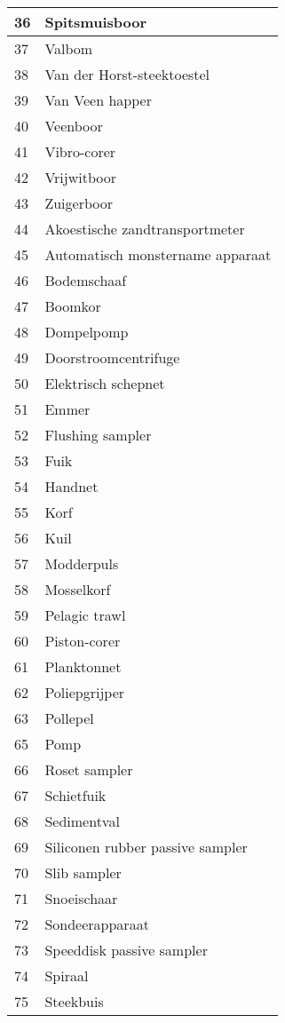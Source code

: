 \documentclass[
]{book}
\begin{document}
\begin{table}
\begin{tabular}[t]{l|l}
\hline
36 & Spitsmuisboor\\
\hline
37 & Valbom\\
\hline
38 & Van der Horst-steektoestel\\
\hline
39 & Van Veen happer\\
\hline
40 & Veenboor\\
\hline
41 & Vibro-corer\\
\hline
42 & Vrijwitboor\\
\hline
43 & Zuigerboor\\
\hline
44 & Akoestische zandtransportmeter\\
\hline
45 & Automatisch monstername apparaat\\
\hline
46 & Bodemschaaf\\
\hline
47 & Boomkor\\
\hline
48 & Dompelpomp\\
\hline
49 & Doorstroomcentrifuge\\
\hline
50 & Elektrisch schepnet\\
\hline
51 & Emmer\\
\hline
52 & Flushing sampler\\
\hline
53 & Fuik\\
\hline
54 & Handnet\\
\hline
55 & Korf\\
\hline
56 & Kuil\\
\hline
57 & Modderpuls\\
\hline
58 & Mosselkorf\\
\hline
59 & Pelagic trawl\\
\hline
60 & Piston-corer\\
\hline
61 & Planktonnet\\
\hline
62 & Poliepgrijper\\
\hline
63 & Pollepel\\
\hline
65 & Pomp\\
\hline
66 & Roset sampler\\
\hline
67 & Schietfuik\\
\hline
68 & Sedimentval\\
\hline
69 & Siliconen rubber passive sampler\\
\hline
70 & Slib sampler\\
\hline
71 & Snoeischaar\\
\hline
72 & Sondeerapparaat\\
\hline
73 & Speeddisk passive sampler\\
\hline
74 & Spiraal\\
\hline
75 & Steekbuis\\

\end{tabular}
\end{table}
\end{document}
